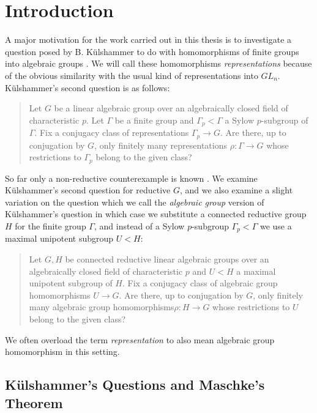 
\chapter{Introduction}
\label{Chapter1}

A major motivation for the work carried out in this thesis is to investigate a question posed by B. K\"ulshammer to do with homomorphisms of finite groups into algebraic groups \cite{slodowy1997two}. We will call these homomorphisms \emph{representations} because of the obvious similarity with the usual kind of representations into $GL_n$. K\"ulshammer's second question is as follows:
\begin{quote}
  Let $G$ be a linear algebraic group over an algebraically closed field of characteristic $p$. Let $\Gamma$ be a finite group and $\Gamma_p < \Gamma$ a Sylow $p$-subgroup of $\Gamma$. Fix a conjugacy class of representations $\Gamma_p\rightarrow G$. Are there, up to conjugation by $G$, only finitely many representations $\rho:\Gamma\rightarrow G$ whose restrictions to $\Gamma_p$ belong to the given class?
\end{quote}

So far only a non-reductive counterexample is known \cite[Appendix]{slodowy1997two}. We examine K\"ulshammer's second question for reductive $G$, and we also examine a slight variation on the question which we call the \emph{algebraic group} version of K\"ulshammer's question in which case we substitute a connected reductive group $H$ for the finite group $\Gamma$, and instead of a Sylow $p$-subgroup $\Gamma_p < \Gamma$ we use a maximal unipotent subgroup $U < H$:
\begin{quote}
  Let $G,H$ be connected reductive linear algebraic groups over an algebraically closed field of characteristic $p$ and $U < H$ a maximal unipotent subgroup of $H$. Fix a conjugacy class of algebraic group homomorphisms $U\rightarrow G$. Are there, up to conjugation by $G$, only finitely many algebraic group homomorphisms$\rho:H\rightarrow G$ whose restrictions to $U$ belong to the given class?
\end{quote}

We often overload the term \emph{representation} to also mean algebraic group homomorphism in this setting.

\section{K\"ulshammer's Questions and Maschke's Theorem}

